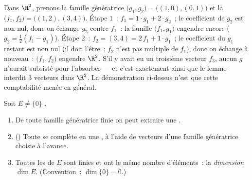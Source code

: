 \begin{example}
\label{ex:b1:findim:exchangerun}
Dans $\R^2$, prenons la famille génératrice $\bigl(g_1, g_2\bigr) =
\bigl((1,0), (0,1)\bigr)$ et la  $\bigl(f_1,
f_2\bigr) = \bigl((1,2), (3,4)\bigr)$. Étape $1$~: $f_1 = 1\cdot
g_1 + 2\cdot g_2$~; le coefficient de $g_2$ est non nul, donc on
échange $g_2$ contre $f_1$~: la famille $\bigl(f_1, g_1\bigr)$
engendre encore ($g_2 = \frac12(f_1 - g_1)$). Étape $2$~: $f_2 =
(3,4) = 2\,f_1 + 1\cdot g_1$~; le coefficient du $g_1$ restant est
non nul (il doit l'être~: $f_2$ n'est pas multiple de $f_1$), donc
on échange à nouveau~: $\bigl(f_1, f_2\bigr)$ engendre $\R^2$. S'il
y avait eu un troisième vecteur  $f_3$, aucun $g$ n'aurait
subsisté pour l'absorber --- et c'est exactement ainsi que le lemme
interdit $3$ vecteurs  dans $\R^2$. La démonstration ci-dessus
n'est que cette comptabilité menée en général.
\end{example}

\begin{theorem}\label{thm:b1:findim:bases}
Soit $E \neq \{0\}$ .
\begin{enumerate}
  \item De toute famille génératrice finie on peut extraire une .
  \item ()
        Toute  se complète en une , à l'aide de
        vecteurs d'une famille génératrice choisie à l'avance.
  \item Toutes les  de $E$ sont finies et ont le même nombre
        d'éléments~: la \emph{dimension} $\dim E$. (Convention~:
        $\dim\{0\} = 0$.)
\end{enumerate}
\end{theorem}

